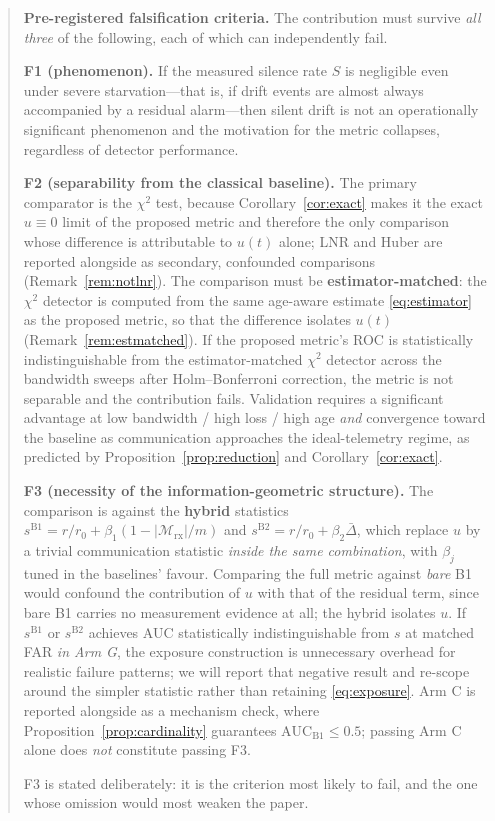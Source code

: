 \documentclass[journal]{IEEEtran}
\theoremstyle{plain}
\theoremstyle{definition}
\theoremstyle{remark}
\newcommand{\Mrx}{\mathcal{M}_{\mathrm{rx}}}
\begin{document}
\begin{quote}
\textbf{Pre-registered falsification criteria.} The contribution must
survive \emph{all three} of the following, each of which can independently
fail.

\textbf{F1 (phenomenon).} If the measured silence rate $S$ is negligible
even under severe starvation---that is, if drift events are almost always
accompanied by a residual alarm---then silent drift is not an
operationally significant phenomenon and the motivation for the metric
collapses, regardless of detector performance.

\textbf{F2 (separability from the classical baseline).} The primary
comparator is the $\chi^{2}$ test, because
Corollary~\ref{cor:exact} makes it the exact $u\equiv0$ limit of the
proposed metric and therefore the only comparison whose difference is
attributable to $u(t)$ alone; LNR and Huber are reported alongside as
secondary, confounded comparisons (Remark~\ref{rem:notlnr}). The comparison must be
\textbf{estimator-matched}: the $\chi^{2}$ detector is computed from the
same age-aware estimate \eqref{eq:estimator} as the proposed metric, so
that the difference isolates $u(t)$ (Remark~\ref{rem:estmatched}). If the
proposed metric's ROC is statistically indistinguishable from the
estimator-matched $\chi^{2}$ detector across the bandwidth sweeps after
Holm--Bonferroni correction, the metric is not separable and the
contribution fails. Validation requires a significant
advantage at low bandwidth / high loss / high age \emph{and} convergence
toward the baseline as communication approaches the ideal-telemetry
regime, as predicted by Proposition~\ref{prop:reduction} and
Corollary~\ref{cor:exact}.

\textbf{F3 (necessity of the information-geometric structure).} The
comparison is against the \textbf{hybrid} statistics
$s^{\mathrm{B1}}=r/r_0+\beta_1(1-|\Mrx|/m)$ and
$s^{\mathrm{B2}}=r/r_0+\beta_2\bar\Delta$, which replace $u$ by a trivial
communication statistic \emph{inside the same combination}, with
$\beta_j$ tuned in the baselines' favour. Comparing the full metric
against \emph{bare} B1 would confound the contribution of $u$ with that of
the residual term, since bare B1 carries no measurement evidence at all;
the hybrid isolates $u$. If $s^{\mathrm{B1}}$ or $s^{\mathrm{B2}}$
achieves AUC statistically indistinguishable from $s$ at matched FAR
\emph{in Arm G}, the exposure construction is unnecessary overhead for
realistic failure patterns; we will report that negative result and
re-scope around the simpler statistic rather than retaining
\eqref{eq:exposure}. Arm C is reported
alongside as a mechanism check, where
Proposition~\ref{prop:cardinality} guarantees
$\mathrm{AUC}_{\mathrm{B1}}\le0.5$; passing Arm C alone does \emph{not}
constitute passing F3.

F3 is stated deliberately: it is the criterion most likely to fail, and
the one whose omission would most weaken the paper.
\end{quote}
\end{document}
